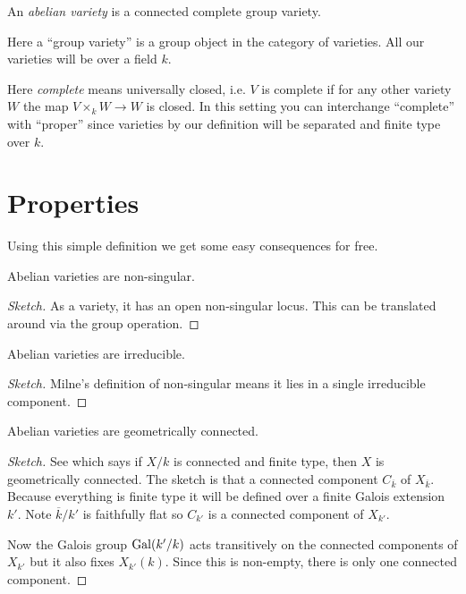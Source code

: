 \documentclass[11pt]{article}
\begin{document}
\begin{defn}\label{def:av}
	An \emph{abelian variety} is a connected complete group variety.
\end{defn}

Here a ``group variety'' is a group object in the category of varieties. All our varieties will be over a field $k$.

\begin{rem}
	Here \emph{complete} means universally closed, i.e. $V$ is complete if for any other variety $W$ the map $V\times_k W \to W$ is closed. In this setting you can interchange ``complete'' with ``proper'' since varieties by our definition will be separated and finite type over $k$.
\end{rem}


\section{Properties}

Using this simple definition we get some easy consequences for free.

\begin{prop}
	Abelian varieties are non-singular.
\end{prop}
\begin{proof}[Sketch]
	As a variety, it has an open non-singular locus. This can be translated around via the group operation.
\end{proof}

\begin{prop}
	Abelian varieties are irreducible.
\end{prop}
\begin{proof}[Sketch]
	Milne's definition of non-singular means it lies in a single irreducible component.
\end{proof}

\begin{prop}
	Abelian varieties are geometrically connected.
\end{prop}
\begin{proof}[Sketch]
	See \cite[Ex.~3.2.11a]{liu2006algebraic} which says if $X/k$ is connected and finite type, then $X$ is geometrically connected. The sketch is that a connected component $C_{\overline{k}}$ of $X_{\overline{k}}$. Because everything is finite type it will be defined over a finite Galois extension $k'$. Note $\overline{k}/k'$ is faithfully flat so $C_{k'}$ is a connected component of $X_{k'}$.
	
	Now the Galois group $\operatorname{Gal}(k'/k)$ acts transitively on the connected components of $X_{k'}$ but it also fixes $X_{k'}(k)$. Since this is non-empty, there is only one connected component.
\end{proof}
\end{document}
